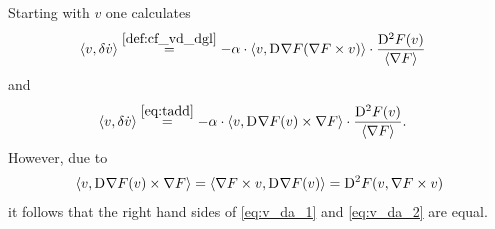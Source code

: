 Starting with $ v $ one calculates
\begin{align}
    \langle  v ,  \delta \dot{ v }  \rangle  &\overset{\eqref{def:cf_vd_dgl}}{=}
    -\alpha \cdot \langle  v ,  \mathrm{D}^{  }\nabla F( \nabla F \times v )  \rangle  \cdot
    \frac{ \mathrm{D}^{ 2 }F( v ) }{ \langle  \nabla F  \rangle }
    \label{eq:v_da_1}
\end{align}
and
\begin{align}
    \langle  v ,  \delta \dot{ v }  \rangle  &\overset{\eqref{eq:tadd}}{=}
    -\alpha \cdot \langle  v ,  \mathrm{D}^{  }\nabla F( v ) \times \nabla F  \rangle  \cdot
    \frac{ \mathrm{D}^{ 2 }F( v ) }{ \langle  \nabla F   \rangle } .
    \label{eq:v_da_2}
\end{align}
However, due to
\begin{align}
    \langle  v ,  \mathrm{D}^{  }\nabla F( v ) \times \nabla F  \rangle  =
    \langle  \nabla F \times v ,  \mathrm{D}^{  }\nabla F( v )  \rangle  =
    \mathrm{D}^{ 2 }F( v, \nabla F \times v )
\end{align}
it follows that the right hand sides
of \eqref{eq:v_da_1} and \eqref{eq:v_da_2} are equal.


